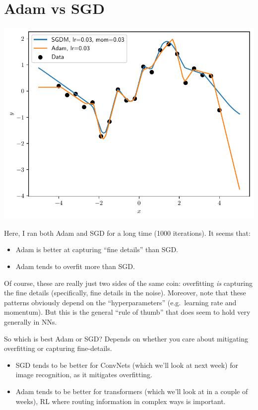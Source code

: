 \documentclass{article}
\newcommand{\0}{\mathbf{0}}
\begin{document}
\newpage
\section{Adam vs SGD}

\includegraphics[width=\textwidth]{adam_vs_sgd.pdf}

Here, I ran both Adam and SGD for a long time (1000 iterations).
It seems that:
\begin{itemize}
  \item Adam is better at capturing ``fine details'' than SGD.
  \item Adam tends to overfit more than SGD.
\end{itemize}
Of course, these are really just two sides of the same coin: overfitting \textit{is} capturing the fine details (specifically, fine details in the noise).
Moreover, note that these patterns obviously depend on the ``hyperparameters'' (e.g.\ learning rate and momentum).  
But this is the general ``rule of thumb'' that does seem to hold very generally in NNs.

So which is best Adam or SGD?  Depends on whether you care about mitigating overfitting or capturing fine-details.
\begin{itemize}
  \item SGD tends to be better for ConvNets (which we'll look at next week) for image recognition, as it mitigates overfitting.
  \item Adam tends to be better for transformers (which we'll look at in a couple of weeks), RL where routing information in complex ways is important.
\end{itemize}
\end{document}
